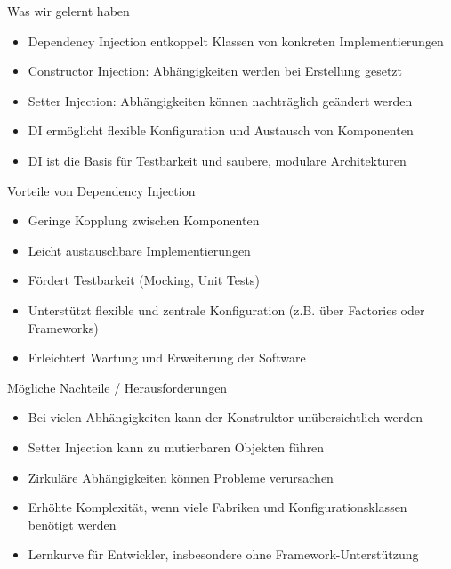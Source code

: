 \begin{frame}{Was wir gelernt haben}
	\begin{itemize}
	    \item Dependency Injection entkoppelt Klassen von konkreten Implementierungen
	    \item Constructor Injection: Abhängigkeiten werden bei Erstellung gesetzt
	    \item Setter Injection: Abhängigkeiten können nachträglich geändert werden
	    \item DI ermöglicht flexible Konfiguration und Austausch von Komponenten
	    \item DI ist die Basis für Testbarkeit und saubere, modulare Architekturen
	\end{itemize}
\end{frame}

\begin{frame}{Vorteile von Dependency Injection}
	\begin{itemize}
	    \item Geringe Kopplung zwischen Komponenten
	    \item Leicht austauschbare Implementierungen
	    \item Fördert Testbarkeit (Mocking, Unit Tests)
	    \item Unterstützt flexible und zentrale Konfiguration (z.B. über Factories oder Frameworks)
	    \item Erleichtert Wartung und Erweiterung der Software
	\end{itemize}
\end{frame}

\begin{frame}{Mögliche Nachteile / Herausforderungen}
	\begin{itemize}
	    \item Bei vielen Abhängigkeiten kann der Konstruktor unübersichtlich werden
	    \item Setter Injection kann zu mutierbaren Objekten führen
	    \item Zirkuläre Abhängigkeiten können Probleme verursachen
	    \item Erhöhte Komplexität, wenn viele Fabriken und Konfigurationsklassen benötigt werden
	    \item Lernkurve für Entwickler, insbesondere ohne Framework-Unterstützung
	\end{itemize}
\end{frame}

